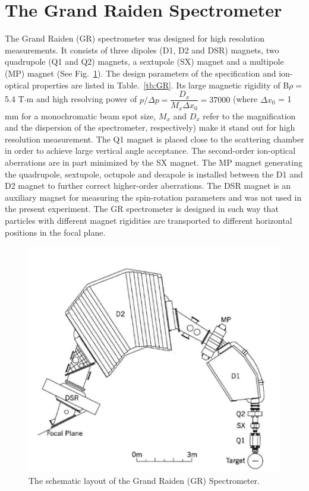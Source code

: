 \section{The Grand Raiden Spectrometer}
The Grand Raiden (GR) spectrometer was designed for high resolution measurements. It consists of three dipoles (D1, D2 and DSR) magnets, two quadrupole  (Q1 and Q2) magnets, a sextupole  (SX)  magnet and a multipole  (MP) magnet (See Fig.~\ref{fig:GR_layout}). The design parameters of the specification and ion-optical properties are listed in Table.~\ref{tb:GR}. Its large magnetic rigidity of B$\rho=$5.4 T$\cdot$m  and high resolving power of $p/\Delta p=\dfrac{D_x}{M_x \Delta x_0}=37000$ (where $\Delta x_0$ = 1 mm for a monochromatic beam spot size, $M_x$ and $D_x$ refer to the magnification and the dispersion of the spectrometer, respectively) make it stand out for high resolution measurement.
The Q1 magnet is placed close to the scattering chamber in order to achieve large vertical angle acceptance.
The second-order ion-optical aberrations are in part minimized by the SX magnet. The MP magnet generating the quadrupole, sextupole, octupole and decapole is installed between the D1 and D2 magnet to further correct higher-order aberrations. The DSR magnet is an auxiliary magnet for measuring the spin-rotation parameters and was not used in the present experiment. The GR spectrometer is designed in such way that particles with different magnet rigidities are transported to different horizontal positions in the focal plane.

\begin{figure}[tpb]
  \begin{center}
    \centerline{\includegraphics[scale=0.7]{graph/ch3/GR_layout}}
    \caption{The schematic layout of the Grand Raiden (GR) Spectrometer. ~\citep{Wakasa200279} }
    \label{fig:GR_layout}
  \end{center}
\end{figure}


